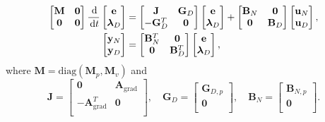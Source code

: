 \documentclass{ifacconf}
\begin{document}
\begin{equation}
\begin{aligned}
\label{eq:discr_phdae}
\begin{bmatrix}
\mathbf{M} & \mathbf{0} \\
\mathbf{0} & \mathbf{0} \\
\end{bmatrix} \frac{\,\mathrm{d}}{\,\mathrm{d} t}
\begin{bmatrix}
\mathbf{e}\\
\bm{\lambda}_D \\
\end{bmatrix}
&= \begin{bmatrix}
\mathbf{J} & \mathbf{G}_D\\
-\mathbf{G}_D^T & \mathbf{0} \\
\end{bmatrix}
\begin{bmatrix}
\mathbf{e}\\
\bm{\lambda}_D \\
\end{bmatrix} + \begin{bmatrix}
\mathbf{B}_N & \mathbf{0}\\
\mathbf{0} & \mathbf{B}_D \\
\end{bmatrix}
\begin{bmatrix}
\mathbf{u}_N \\
\mathbf{u}_D \\
\end{bmatrix}, \\
\begin{bmatrix}
\mathbf{y}_N \\
\mathbf{y}_D \\
\end{bmatrix} &=
\begin{bmatrix}
\mathbf{B}_N^T & \mathbf{0} \\ 
\mathbf{0} & \mathbf{B}_D^T \\ 
\end{bmatrix}
\begin{bmatrix}
\mathbf{e}\\
\bm{\lambda}_D \\
\end{bmatrix},
\end{aligned}
\end{equation}
where $\mathbf{M} = \mathrm{diag}(\mathbf{M}_p, \mathbf{M}_v)$ and
\begin{equation*}
\mathbf{J} = \begin{bmatrix}
\mathbf{0} & \mathbf{A}_{\mathrm{grad}} \\
- \mathbf{A}_{\mathrm{grad}}^T & \mathbf{0} \\
\end{bmatrix}, \quad 
\mathbf{G}_{D} = \begin{bmatrix}
\mathbf{G}_{D, p} \\
\mathbf{0} \\
\end{bmatrix}, \quad
\mathbf{B}_{N} = \begin{bmatrix}
\mathbf{B}_{N, p} \\
\mathbf{0} \\
\end{bmatrix}.
\end{equation*}
\end{document}
